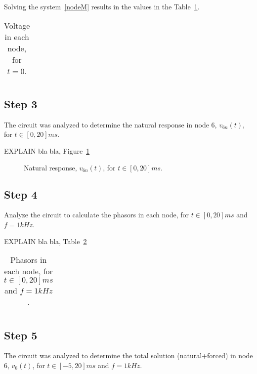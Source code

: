 Solving the system~\ref{nodeM} results in the values in the Table~\ref{tab:teo2}.

\begin{table}[ht!]
  \centering
  \begin{tabular}{cc}
  \end{tabular}
  \caption{Voltage in each node, for $t=0$.}
  \label{tab:teo2}
\end{table}
\FloatBarrier



\subsection{Step 3}
The circuit was analyzed to determine the natural response in node 6, $v_{6n}(t)$, for $t\in [0,20]ms$.

{\color{red}
\Huge EXPLAIN
}
bla bla, Figure~\ref{fig:v6n}

\begin{figure}[ht!]
  \centering
  \caption{Natural response, $v_{6n}(t)$, for $t\in [0,20]ms$.}
  \label{fig:v6n}
\end{figure}
\FloatBarrier





\subsection{Step 4}
Analyze the circuit to calculate the phasors in each node, for $t\in [0,20]ms$ and $f=1kHz$.

{\color{red}
\Huge EXPLAIN
}
bla bla, Table~\ref{tab:teo4}


\begin{table}[ht!]
  \centering
  \begin{tabular}{cc}
  \end{tabular}
  \caption{Phasors in each node, for $t\in [0,20]ms$ and $f=1kHz$.}
  \label{tab:teo4}
\end{table}
\FloatBarrier





\subsection{Step 5}
The circuit was analyzed to determine the total solution (natural+forced) in node 6, $v_6(t)$, for $t\in [-5,20]ms$ and $f=1kHz$.

